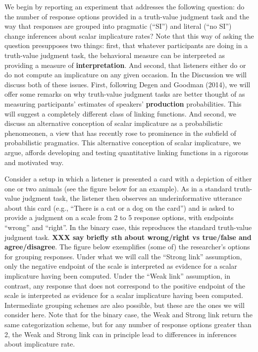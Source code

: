 \documentclass[floatsintext,man]{apa6}
\theoremstyle{definition}
\theoremstyle{definition}
\theoremstyle{definition}
\theoremstyle{remark}
\begin{document}
We begin by reporting an experiment that addresses the following
question: do the number of response options provided in a truth-value
judgment task and the way that responses are grouped into pragmatic
(\enquote{SI}) and literal (\enquote{no SI}) change inferences about
scalar implicature rates? Note that this way of asking the question
presupposes two things: first, that whatever participants are doing in a
truth-value judgment task, the behavioral measure can be interpreted as
providing a measure of \textbf{interpretation}. And second, that
listeners either do or do not compute an implicature on any given
occasion. In the Discussion we will discuss both of these issues. First,
following Degen and Goodman (2014), we will offer some remarks on why
truth-value judgment tasks are better thought of as measuring
participants' estimates of speakers' \textbf{production} probabilities.
This will suggest a completely different class of linking functions. And
second, we discuss an alternative conception of scalar implicature as a
probabilistic phenomeonen, a view that has recently rose to prominence
in the subfield of probabilistic pragmatics. This alternative conception
of scalar implicature, we argue, affords developing and testing
quantitative linking functions in a rigorous and motivated way.

Consider a setup in which a listener is presented a card with a
depiction of either one or two animals (see the figure below for an
example). As in a standard truth-value judgment task, the listener then
observes an underinformative utterance about this card (e.g.,
\enquote{There is a cat or a dog on the card}) and is asked to provide a
judgment on a scale from 2 to 5 response options, with endpoints
\enquote{wrong} and \enquote{right}. In the binary case, this reproduces
the standard truth-value judgment task. \textbf{XXX say briefly sth
about wrong/right vs true/false and agree/disagree}. The figure below
exemplifies (some of) the researcher's options for grouping responses.
Under what we will call the \enquote{Strong link} assumption, only the
negative endpoint of the scale is interpreted as evidence for a scalar
implicature having been computed. Under the \enquote{Weak link}
assumption, in contrast, any response that does not correspond to the
positive endpoint of the scale is interpreted as evidence for a scalar
implicature having been computed. Intermediate grouping schemes are also
possible, but these are the ones we will consider here. Note that for
the binary case, the Weak and Strong link return the same categorization
scheme, but for any number of response options greater than 2, the Weak
and Strong link can in principle lead to differences in inferences about
implicature rate.
\end{document}
